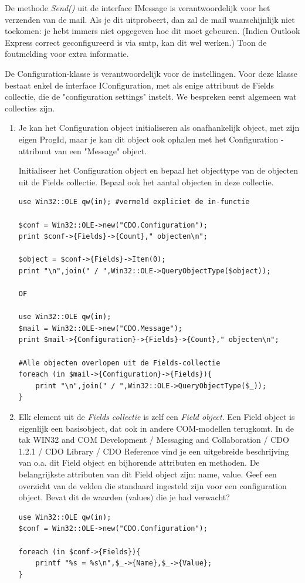 \documentclass[11pt,a4paper]{report}
\begin{document}
De methode \textit{Send()} uit de interface IMessage is verantwoordelijk voor het verzenden van de mail. Als je dit uitprobeert, dan zal de mail waarschijnlijk niet toekomen: je hebt immers niet opgegeven hoe dit moet gebeuren. (Indien Outlook Express correct geconfigureerd is via smtp, kan dit wel werken.) Toon de foutmelding voor extra informatie.
\par De Configuration-klasse is verantwoordelijk voor de instellingen. Voor deze klasse bestaat enkel de interface IConfiguration, met als enige attribuut de Fields collectie, die de "configuration settings" instelt. We bespreken eerst algemeen wat collecties zijn.
\begin{enumerate}[resume]
	\item Je kan het Configuration object initialiseren als onafhankelijk object, met zijn eigen ProgId, maar je kan dit object ook ophalen met het Configuration - attribuut van een "Message" object.
	\par Initialiseer het Configuration object en bepaal het objecttype van de objecten uit de Fields collectie. Bepaal ook het aantal objecten in deze collectie.
\begin{lstlisting}
use Win32::OLE qw(in); #vermeld expliciet de in-functie

$conf = Win32::OLE->new("CDO.Configuration");
print $conf->{Fields}->{Count}," objecten\n";

$object = $conf->{Fields}->Item(0);
print "\n",join(" / ",Win32::OLE->QueryObjectType($object));

OF

use Win32::OLE qw(in);
$mail = Win32::OLE->new("CDO.Message");
print $mail->{Configuration}->{Fields}->{Count}," objecten\n";

#Alle objecten overlopen uit de Fields-collectie
foreach (in $mail->{Configuration}->{Fields}){
	print "\n",join(" / ",Win32::OLE->QueryObjectType($_));
}
\end{lstlisting}
	\item Elk element uit de \textit{Fields collectie} is zelf een \textit{Field object}. Een Field object is eigenlijk een basisobject, dat ook in andere COM-modellen terugkomt. In de tak WIN32 and COM Development / Messaging and Collaboration / CDO 1.2.1 / CDO Library / CDO Reference vind je een uitgebreide beschrijving van o.a. dit Field object en bijhorende attributen en methoden. De belangrijkste attributen van dit Field object zijn: name, value. Geef een overzicht van de velden die standaard ingesteld zijn voor een configuration object. Bevat dit de waarden (values) die je had verwacht?
\begin{lstlisting}
use Win32::OLE qw(in);
$conf = Win32::OLE->new("CDO.Configuration");

foreach (in $conf->{Fields}){
	printf "%s = %s\n",$_->{Name},$_->{Value};
}
\end{lstlisting}
\end{enumerate}
\end{document}
